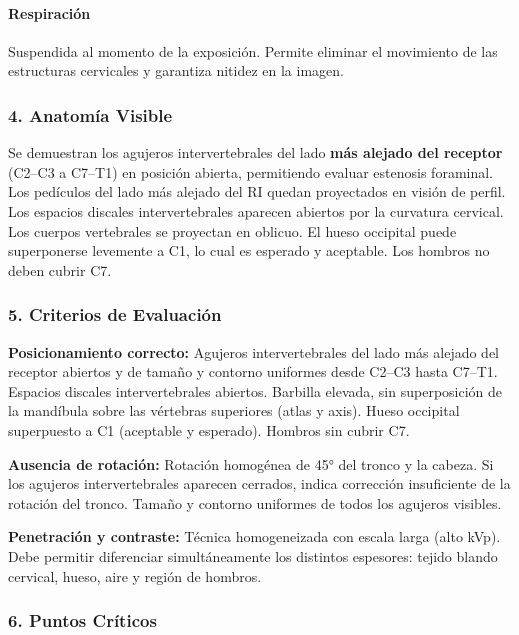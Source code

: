 	\paragraph{Respiración}
	Suspendida al momento de la exposición. Permite eliminar el movimiento de las estructuras cervicales y garantiza nitidez en la imagen.
	
	\subsubsection*{4. Anatomía Visible}
	
	Se demuestran los agujeros intervertebrales del lado \textbf{más alejado del receptor} (C2--C3 a C7--T1) en posición abierta, permitiendo evaluar estenosis foraminal. Los pedículos del lado más alejado del RI quedan proyectados en visión de perfil. Los espacios discales intervertebrales aparecen abiertos por la curvatura cervical. Los cuerpos vertebrales se proyectan en oblicuo. El hueso occipital puede superponerse levemente a C1, lo cual es esperado y aceptable. Los hombros no deben cubrir C7.
	
	\subsubsection*{5. Criterios de Evaluación}
	
	\textbf{Posicionamiento correcto:} Agujeros intervertebrales del lado más alejado del receptor abiertos y de tamaño y contorno uniformes desde C2--C3 hasta C7--T1. Espacios discales intervertebrales abiertos. Barbilla elevada, sin superposición de la mandíbula sobre las vértebras superiores (atlas y axis). Hueso occipital superpuesto a C1 (aceptable y esperado). Hombros sin cubrir C7.
	
	\textbf{Ausencia de rotación:} Rotación homogénea de 45° del tronco y la cabeza. Si los agujeros intervertebrales aparecen cerrados, indica corrección insuficiente de la rotación del tronco. Tamaño y contorno uniformes de todos los agujeros visibles.
	
	\textbf{Penetración y contraste:} Técnica homogeneizada con escala larga (alto kVp). Debe permitir diferenciar simultáneamente los distintos espesores: tejido blando cervical, hueso, aire y región de hombros.
	
	\subsubsection*{6. Puntos Críticos}
	
